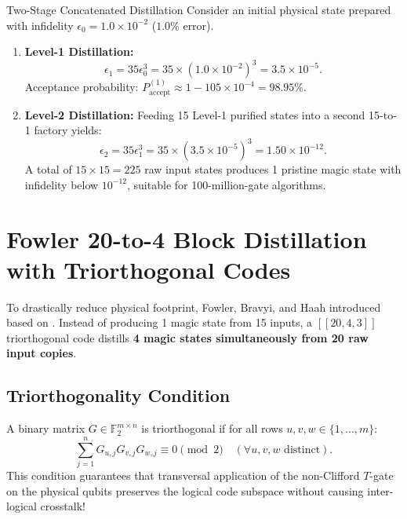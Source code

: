 \begin{examplebox}{{Two-Stage Concatenated Distillation}}
Consider an initial physical state prepared with infidelity $\epsilon_0 = 1.0 \times 10^{-2}$ ($1.0\%$ error).
\begin{enumerate}
    \item \textbf{Level-1 Distillation:}
    \begin{equation}
        \epsilon_1 = 35 \epsilon_0^3 = 35 \times (1.0 \times 10^{-2})^3 = 3.5 \times 10^{-5}.
    \end{equation}
    Acceptance probability: $P_{\text{accept}}^{(1)} \approx 1 - 105 \times 10^{-4} = 98.95\%$.
    \item \textbf{Level-2 Distillation:} Feeding 15 Level-1 purified states into a second 15-to-1 factory yields:
    \begin{equation}
        \epsilon_2 = 35 \epsilon_1^3 = 35 \times (3.5 \times 10^{-5})^3 = 1.50 \times 10^{-12}.
    \end{equation}
    A total of $15 \times 15 = 225$ raw input states produces 1 pristine magic state with infidelity below $10^{-12}$, suitable for 100-million-gate algorithms.
\end{enumerate}
\end{examplebox}


\section{Fowler 20-to-4 Block Distillation with Triorthogonal Codes}
\label{sec:fowler_20_to_4}

To drastically reduce physical footprint, Fowler, Bravyi, and Haah introduced  based on . Instead of producing 1 magic state from 15 inputs, a $[[20, 4, 3]]$ triorthogonal code distills \textbf{4 magic states simultaneously from 20 raw input copies}.

\subsection{Triorthogonality Condition}
A binary matrix $G \in \mathbb{F}_2^{m \times n}$ is triorthogonal if for all rows $u, v, w \in \{1, \dots, m\}$:
\begin{equation}
    \sum_{j=1}^n G_{u, j} G_{v, j} G_{w, j} \equiv 0 \pmod 2 \quad (\forall u, v, w \text{ distinct}).
    \label{eq:triorthogonality_def_exp}
\end{equation}
This condition guarantees that transversal application of the non-Clifford $T$-gate on the physical qubits preserves the logical code subspace without causing inter-logical crosstalk!

